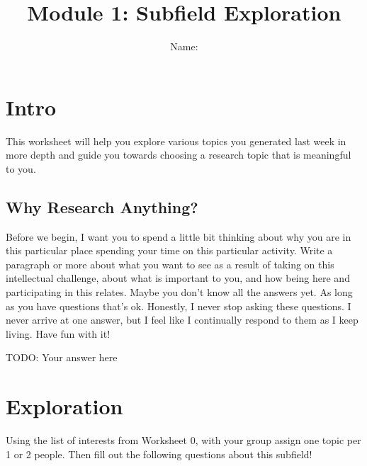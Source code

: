 \documentclass[letterpaper,11pt]{article}
\begin{document}
\title{{\bf Module 1: Subfield Exploration} }
\author{Name: }

\date{}
\maketitle

\section{Intro}
This worksheet will help you explore various topics you generated last week in more depth and guide you towards choosing a research topic that is meaningful to you.
\subsection{Why Research Anything?}
Before we begin, I want you to spend a little bit thinking about why you are in this particular place spending your time on this particular activity. Write a paragraph or more about what you want to see as a result of taking on this intellectual challenge, about what is important to you, and how being here and participating in this relates. Maybe you don't know all the answers yet. As long as you have questions that's ok. Honestly, I never stop asking these questions. I never arrive at one answer, but I feel like I continually respond to them as I keep living. Have fun with it!
\begin{tcolorbox}
TODO: Your answer here
\newline
\newline
\newline
\newline
\newline
\newline
\newline
\newline
\newline
\newline
\newline
\end{tcolorbox}
\section{Exploration}
Using the list of interests from Worksheet 0, with your group assign one topic per 1 or 2 people. Then fill out the following questions about this subfield!
\end{document}
